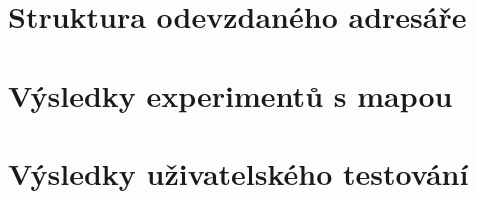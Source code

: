 
%






\chapter{Struktura odevzdaného adresáře}\label{chap:file_directory}

\chapter{Výsledky experimentů s mapou}\label{chap:map_experiments}

\chapter{Výsledky uživatelského testování}\label{chap:user_testing}

%
